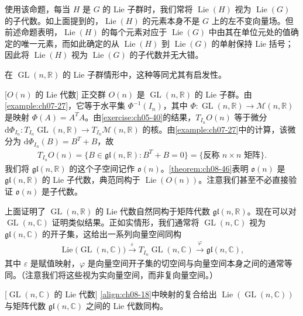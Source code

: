 \documentclass[../../main.tex]{subfiles}
\begin{document}
使用该命题，每当 $H$ 是 $G$ 的 Lie 子群时，我们常将 $\operatorname{Lie}(H)$ 视为 $\operatorname{Lie}(G)$ 的子代数。如上面提到的，$\operatorname{Lie}(H)$ 的元素本身不是 $G$ 上的左不变向量场。但前述命题表明，$\operatorname{Lie}(H)$ 的每个元素对应于 $\operatorname{Lie}(G)$ 中由其在单位元处的值确定的唯一元素，而如此确定的从 $\operatorname{Lie}(H)$ 到 $\operatorname{Lie}(G)$ 的单射保持 Lie 括号；因此将 $\operatorname{Lie}(H)$ 视为 $\operatorname{Lie}(G)$ 的子代数并无大错。

在 $\operatorname{GL}(n,\mathbb{R})$ 的 Lie 子群情形中，这种等同尤其有启发性。

\begin{example}\label{example:ch08-47}[$O(n)$ 的 Lie 代数]
正交群 $O(n)$ 是 $\operatorname{GL}(n,\mathbb{R})$ 的 Lie 子群。由\cref{example:ch07-27}，它等于水平集 $\Phi^{-1}(I_n)$，其中 $\Phi\colon\operatorname{GL}(n,\mathbb{R})\to\mathcal{M}(n,\mathbb{R})$ 是映射 $\Phi(A)=A^{T}A$。由\cref{exercise:ch05-40}的结果，$T_{I_n}O(n)$ 等于微分 $\mathrm{d}\Phi_{I_n}\colon T_{I_n}\operatorname{GL}(n,\mathbb{R})\to T_{I_n}\mathcal{M}(n,\mathbb{R})$ 的核。由\cref{example:ch07-27}中的计算，该微分为 $\mathrm{d}\Phi_{I_n}(B)=B^{T}+B$，故
\begin{align*}
T_{I_n}O(n)=\{B\in\mathfrak{gl}(n,\mathbb{R}):B^{T}+B=0\}=\{\text{反称 }n\times n\text{ 矩阵}\}.
\end{align*}
我们将 $\mathfrak{gl}(n,\mathbb{R})$ 的这个子空间记作 $\mathfrak{o}(n)$。\cref{theorem:ch08-46}表明 $\mathfrak{o}(n)$ 是 $\mathfrak{gl}(n,\mathbb{R})$ 的 Lie 子代数，典范同构于 $\operatorname{Lie}(O(n))$。注意我们甚至不必直接验证 $\mathfrak{o}(n)$ 是子代数。
\end{example}

上面证明了 $\operatorname{GL}(n,\mathbb{R})$ 的 Lie 代数自然同构于矩阵代数 $\mathfrak{gl}(n,\mathbb{R})$。现在可以对 $\operatorname{GL}(n,\mathbb{C})$ 证明类似结果。正如实情形，我们通常将 $\operatorname{GL}(n,\mathbb{C})$ 视为 $\mathfrak{gl}(n,\mathbb{C})$ 的开子集，这给出一系列向量空间同构
\begin{align}
\operatorname{Lie}\bigl(\operatorname{GL}(n,\mathbb{C})\bigr)\xrightarrow{\varepsilon}T_{I_n}\operatorname{GL}(n,\mathbb{C})\xrightarrow{\varphi}\mathfrak{gl}(n,\mathbb{C}),\label{align:ch08-18}
\end{align}
其中 $\varepsilon$ 是赋值映射，$\varphi$ 是向量空间开子集的切空间与向量空间本身之间的通常等同。（注意我们将这些视为实向量空间，而非复向量空间。）

\begin{proposition}\label{proposition:ch08-48}[$\operatorname{GL}(n,\mathbb{C})$ 的 Lie 代数]
\eqref{align:ch08-18}中映射的复合给出 $\operatorname{Lie}(\operatorname{GL}(n,\mathbb{C}))$ 与矩阵代数 $\mathfrak{gl}(n,\mathbb{C})$ 之间的 Lie 代数同构。
\end{proposition}
\end{document}

